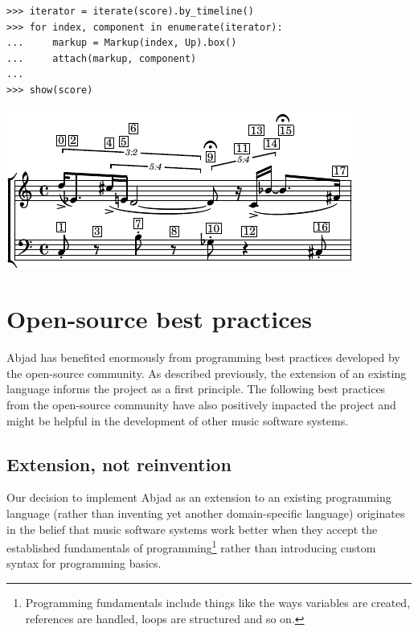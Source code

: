 \documentclass{article}
\begin{document}

\begin{lstlisting}
>>> iterator = iterate(score).by_timeline()
>>> for index, component in enumerate(iterator):
...     markup = Markup(index, Up).box()
...     attach(markup, component)
...
>>> show(score)
\end{lstlisting}
\includegraphics{assets/lilypond-a0f0024aef8572171e2aa922cc739cb1.pdf}

\section{Open-source best practices} \label{sec:open-source}

Abjad has benefited enormously from programming best practices developed by the
open-source community. As described previously, the extension of an existing
language informs the project as a first principle. The following best practices
from the open-source community have also positively impacted the project and
might be helpful in the development of other music software systems.

\subsection{Extension, not reinvention}

Our decision to implement Abjad as an extension to an existing
programming language (rather than inventing yet another domain-specific
language) originates in the belief that music software systems work better when
they accept the established fundamentals of programming\footnote{Programming
fundamentals include things like the ways variables are created, references are
handled, loops are structured and so on.} rather than introducing custom syntax
for programming basics.
\end{document}
